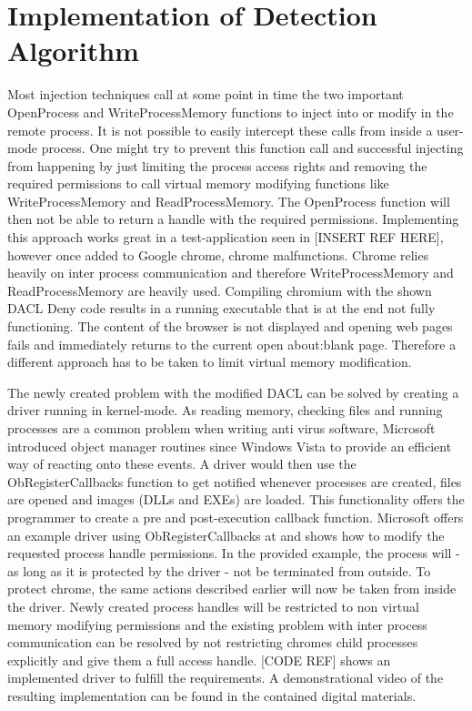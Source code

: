 \section{Implementation of Detection Algorithm}
\label{sec:implementation_dacl}
Most injection techniques call at some point in time the two important OpenProcess and WriteProcessMemory functions to inject into or modify in the remote process. It is not possible to easily intercept these calls from inside a user-mode process. One might try to prevent this function call and successful injecting from happening by just limiting the process access rights and removing the required permissions to call virtual memory modifying functions like WriteProcessMemory and ReadProcessMemory. The OpenProcess function will then not be able to return a handle with the required permissions. Implementing this approach works great in a test-application seen in [INSERT REF HERE], however once added to Google chrome, chrome malfunctions. Chrome relies heavily on inter process communication and therefore WriteProcessMemory and ReadProcessMemory are heavily used. Compiling chromium with the shown DACL Deny code results in a running executable that is at the end not fully functioning. The content of the browser is not displayed and opening web pages fails and immediately returns to the current open about:blank page. Therefore a different approach has to be taken to limit virtual memory modification.

The newly created problem with the modified DACL can be solved by creating a driver running in kernel-mode. As reading memory, checking files and running processes are a common problem when writing anti virus software, Microsoft introduced object manager routines since Windows Vista to provide an efficient way of reacting onto these events. A driver would then use the ObRegisterCallbacks function to get notified whenever processes are created, files are opened and images (DLLs and EXEs) are loaded. This functionality offers the programmer to create a pre and post-execution callback function. Microsoft offers an example driver using ObRegisterCallbacks at \cite{github_obcallback} and shows how to modify the requested process handle permissions. In the provided example, the process will - as long as it is protected by the driver - not be terminated from outside. To protect chrome, the same actions described earlier will now be taken from inside the driver. Newly created process handles will be restricted to non virtual memory modifying permissions and the existing problem with inter process communication can be resolved by not restricting chromes child processes explicitly and give them a full access handle. [CODE REF] shows an implemented driver to fulfill the requirements. A demonstrational video of the resulting implementation can be found in the contained digital materials.

